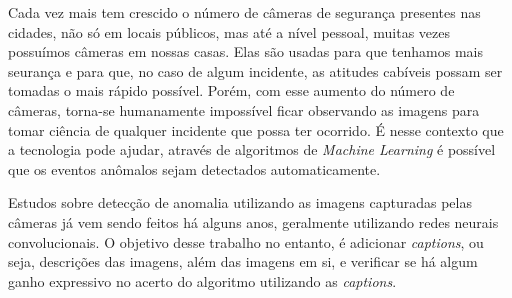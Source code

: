 Cada vez mais tem crescido o número de câmeras de segurança presentes nas cidades, não só em locais públicos, mas até a nível pessoal, muitas vezes possuímos câmeras em nossas casas. Elas são usadas para que tenhamos mais seurança e para que, no caso de algum incidente, as atitudes cabíveis possam ser tomadas o mais rápido possível. Porém, com esse aumento do número de câmeras, torna-se humanamente impossível ficar observando as imagens para tomar ciência de qualquer incidente que possa ter ocorrido. É nesse contexto que a tecnologia pode ajudar, através de algoritmos de \textit{Machine Learning} é possível que os eventos anômalos sejam detectados automaticamente. 

Estudos sobre detecção de anomalia utilizando as imagens capturadas pelas câmeras já vem sendo feitos há alguns anos, geralmente utilizando redes neurais convolucionais. O objetivo desse trabalho no entanto, é adicionar \textit{captions}, ou seja, descrições das imagens, além das imagens em si, e verificar se há algum ganho expressivo no acerto do algoritmo utilizando as \textit{captions}.


